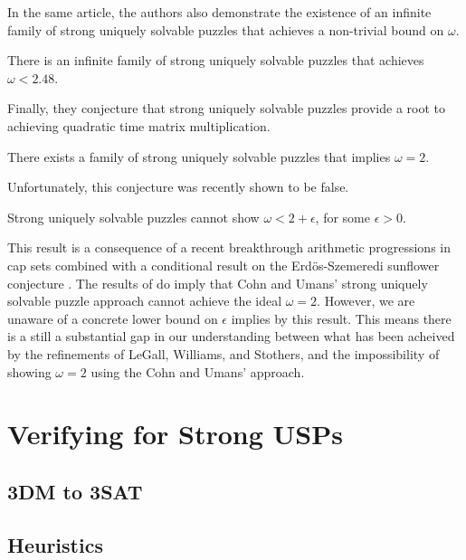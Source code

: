 \documentclass[11pt]{article}
\begin{document}
In the same article, the authors also demonstrate the existence of an
infinite family of strong uniquely solvable puzzles that achieves a
non-trivial bound on $\omega$.

\begin{lemma}
  There is an infinite family of strong uniquely solvable puzzles that
  achieves $\omega < 2.48$.
\end{lemma}

Finally, they conjecture that strong uniquely solvable puzzles provide
a root to achieving quadratic time matrix multiplication.

\begin{conjecture}
  There exists a family of strong uniquely solvable puzzles that
  implies $\omega = 2$.
\end{conjecture}

Unfortunately, this conjecture was recently shown to be false.

\begin{lemma}
  Strong uniquely solvable puzzles cannot show $\omega < 2 +
  \epsilon$, for some $\epsilon > 0$.
\end{lemma}

This result is a consequence of a recent breakthrough arithmetic
progressions in cap sets \cite{e16,clp16} combined with a conditional
result on the Erd\"{o}s-Szemeredi sunflower conjecture \cite{asu13}.
The results of \cite{bccgu16} do imply that Cohn and Umans' strong
uniquely solvable puzzle approach cannot achieve the ideal $\omega =
2$.  However, we are unaware of a concrete lower bound on $\epsilon$
implies by this result.  This means there is a still a substantial gap
in our understanding between what has been acheived by the refinements
of LeGall, Williams, and Stothers, and the impossibility of showing
$\omega = 2$ using the Cohn and Umans' approach.



\section{Verifying for Strong USPs}
\label{sec:verify}

\subsection{3DM to 3SAT}
\label{subsec:3sat}

\subsection{Heuristics}
\label{sec:heuristic}
\end{document}

